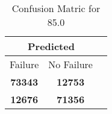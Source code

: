 \begin{table}[] 
\label{Table: Prediction Accuracy-DMD85.0OnlySunEKF-ignoreReflection-Reflection} 
\caption{Confusion Matric for 85.0} 
\centering 
\begin{tabular} 
 {@{}ccc@{}} 
\toprule 
\multicolumn{2}{c}{\textbf{Predicted}}
 \\ \midrule 
\multicolumn{1}{|c|}{Failure} & 
\multicolumn{1}{c|}{No Failure}
 \\ \midrule 
\multicolumn{1}{|c|}{\color{green}\textbf{73343}} & 
\multicolumn{1}{c|}{\color{red}\textbf{12753}}
 \\ \midrule 
\multicolumn{1}{|c|}{\color{red}\textbf{12676}} & 
\multicolumn{1}{c|}{\color{green}\textbf{71356}}
 \\ \bottomrule 
\end{tabular} 
\end{table} 

